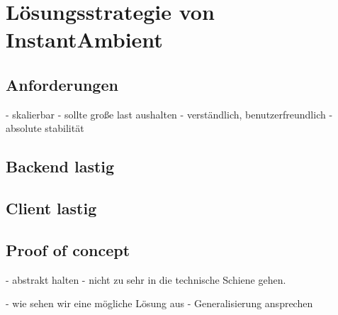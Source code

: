 \chapter{Lösungsstrategie von InstantAmbient}

\section{Anforderungen}

- skalierbar
- sollte große last aushalten
- verständlich, benutzerfreundlich
- absolute stabilität 


\section{Backend lastig}

\section{Client lastig}

\section{Proof of concept}


- abstrakt halten
- nicht zu sehr in die technische Schiene gehen. 

- wie sehen wir eine mögliche Lösung aus
- Generalisierung ansprechen